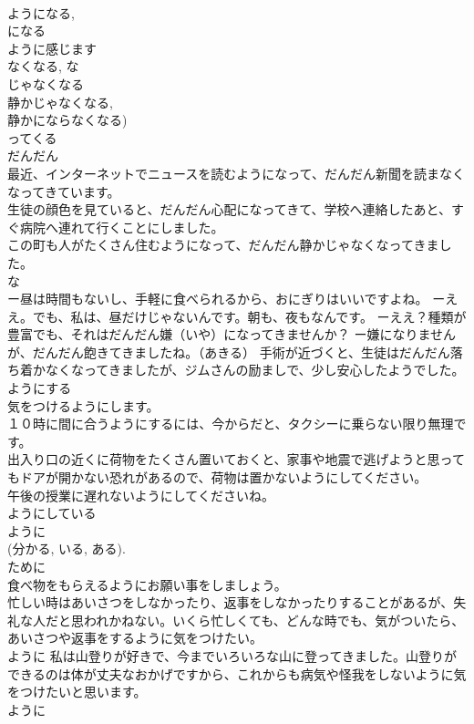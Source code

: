 \documentclass[8pt]{extreport}
\begin{document}
\begin{CJK}{UTF8}{min}
\\	ようになる, 
\\	になる 
\\	ように感じます　
\\	なくなる, な
\\	じゃなくなる 
\\	静かじゃなくなる, 
\\	静かにならなくなる) 
\\	ってくる 
\\	だんだん 
\\	最近、インターネットでニュースを読むようになって、だんだん新聞を読まなくなってきています。 
\\	生徒の顔色を見ていると、だんだん心配になってきて、学校へ連絡したあと、すぐ病院へ連れて行くことにしました。　
\\	この町も人がたくさん住むようになって、だんだん静かじゃなくなってきました。 
\\	な
\\	ー昼は時間もないし、手軽に食べられるから、おにぎりはいいですよね。 ーええ。でも、私は、昼だけじゃないんです。朝も、夜もなんです。 ーええ？種類が豊富でも、それはだんだん嫌（いや）になってきませんか？ ー嫌になりませんが、だんだん飽きてきましたね。（あきる） 手術が近づくと、生徒はだんだん落ち着かなくなってきましたが、ジムさんの励ましで、少し安心したようでした。 ようにする 
\\	気をつけるようにします。 
\\	１０時に間に合うようにするには、今からだと、タクシーに乗らない限り無理です。
\\	出入り口の近くに荷物をたくさん置いておくと、家事や地震で逃げようと思ってもドアが開かない恐れがあるので、荷物は置かないようにしてください。 
\\	午後の授業に遅れないようにしてくださいね。 
\\	ようにしている 
\\	ように
\\	(分かる, いる, ある). 
\\	ために 
\\	食べ物をもらえるようにお願い事をしましょう。 
\\	忙しい時はあいさつをしなかったり、返事をしなかったりすることがあるが、失礼な人だと思われかねない。いくら忙しくても、どんな時でも、気がついたら、あいさつや返事をするように気をつけたい。 
\\	ように 私は山登りが好きで、今までいろいろな山に登ってきました。山登りができるのは体が丈夫なおかげですから、これからも病気や怪我をしないように気をつけたいと思います。 
\\	ように

\end{CJK}
\end{document}
